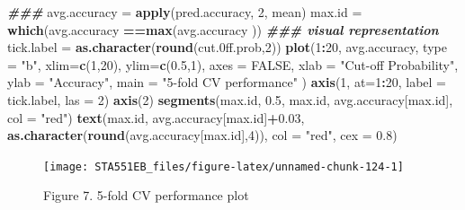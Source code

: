 \documentclass[
]{book}
\newenvironment{Shaded}{\begin{snugshade}}{\end{snugshade}}
\newcommand{\AttributeTok}[1]{\textcolor[rgb]{0.13,0.29,0.53}{#1}}
\newcommand{\ConstantTok}[1]{\textcolor[rgb]{0.56,0.35,0.01}{#1}}
\newcommand{\DecValTok}[1]{\textcolor[rgb]{0.00,0.00,0.81}{#1}}
\newcommand{\DocumentationTok}[1]{\textcolor[rgb]{0.56,0.35,0.01}{\textbf{\textit{#1}}}}
\newcommand{\FloatTok}[1]{\textcolor[rgb]{0.00,0.00,0.81}{#1}}
\newcommand{\FunctionTok}[1]{\textcolor[rgb]{0.13,0.29,0.53}{\textbf{#1}}}
\newcommand{\NormalTok}[1]{#1}
\newcommand{\OtherTok}[1]{\textcolor[rgb]{0.56,0.35,0.01}{#1}}
\newcommand{\SpecialCharTok}[1]{\textcolor[rgb]{0.81,0.36,0.00}{\textbf{#1}}}
\newcommand{\StringTok}[1]{\textcolor[rgb]{0.31,0.60,0.02}{#1}}
\begin{document}
\begin{Shaded}
\begin{Highlighting}[]
\DocumentationTok{\#\#\#  }
\NormalTok{avg.accuracy }\OtherTok{=} \FunctionTok{apply}\NormalTok{(pred.accuracy, }\DecValTok{2}\NormalTok{, mean)}
\NormalTok{max.id }\OtherTok{=} \FunctionTok{which}\NormalTok{(avg.accuracy }\SpecialCharTok{==}\FunctionTok{max}\NormalTok{(avg.accuracy ))}
\DocumentationTok{\#\#\# visual representation}
\NormalTok{tick.label }\OtherTok{=} \FunctionTok{as.character}\NormalTok{(}\FunctionTok{round}\NormalTok{(cut}\FloatTok{.0}\NormalTok{ff.prob,}\DecValTok{2}\NormalTok{))}
\FunctionTok{plot}\NormalTok{(}\DecValTok{1}\SpecialCharTok{:}\DecValTok{20}\NormalTok{, avg.accuracy, }\AttributeTok{type =} \StringTok{"b"}\NormalTok{,}
     \AttributeTok{xlim=}\FunctionTok{c}\NormalTok{(}\DecValTok{1}\NormalTok{,}\DecValTok{20}\NormalTok{), }
     \AttributeTok{ylim=}\FunctionTok{c}\NormalTok{(}\FloatTok{0.5}\NormalTok{,}\DecValTok{1}\NormalTok{), }
     \AttributeTok{axes =} \ConstantTok{FALSE}\NormalTok{,}
     \AttributeTok{xlab =} \StringTok{"Cut{-}off Probability"}\NormalTok{,}
     \AttributeTok{ylab =} \StringTok{"Accuracy"}\NormalTok{,}
     \AttributeTok{main =} \StringTok{"5{-}fold CV performance"}
\NormalTok{     )}
\FunctionTok{axis}\NormalTok{(}\DecValTok{1}\NormalTok{, }\AttributeTok{at=}\DecValTok{1}\SpecialCharTok{:}\DecValTok{20}\NormalTok{, }\AttributeTok{label =}\NormalTok{ tick.label, }\AttributeTok{las =} \DecValTok{2}\NormalTok{)}
\FunctionTok{axis}\NormalTok{(}\DecValTok{2}\NormalTok{)}
\FunctionTok{segments}\NormalTok{(max.id, }\FloatTok{0.5}\NormalTok{, max.id, avg.accuracy[max.id], }\AttributeTok{col =} \StringTok{"red"}\NormalTok{)}
\FunctionTok{text}\NormalTok{(max.id, avg.accuracy[max.id]}\SpecialCharTok{+}\FloatTok{0.03}\NormalTok{, }\FunctionTok{as.character}\NormalTok{(}\FunctionTok{round}\NormalTok{(avg.accuracy[max.id],}\DecValTok{4}\NormalTok{)), }\AttributeTok{col =} \StringTok{"red"}\NormalTok{, }\AttributeTok{cex =} \FloatTok{0.8}\NormalTok{)}
\end{Highlighting}
\end{Shaded}

\begin{figure}

{\centering \texttt{[image: STA551EB\_files/figure-latex/unnamed-chunk-124-1]} 

}

\caption{Figure 7. 5-fold CV performance plot}\label{fig:unnamed-chunk-124}
\end{figure}
\end{document}
